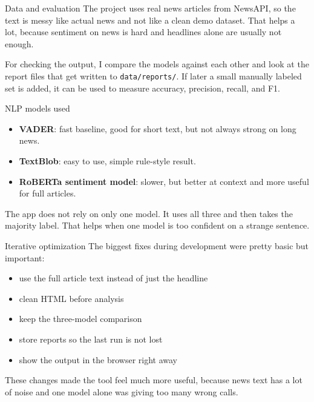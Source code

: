 \documentclass[aspectratio=169]{beamer}
\newcommand{\pkg}[1]{\texttt{#1}}
\begin{document}
\begin{frame}{Data and evaluation}
The project uses real news articles from NewsAPI, so the text is messy like actual news and not like a clean demo dataset. That helps a lot, because sentiment on news is hard and headlines alone are usually not enough.

\vspace{2mm}
For checking the output, I compare the models against each other and look at the report files that get written to \pkg{data/reports/}. If later a small manually labeled set is added, it can be used to measure accuracy, precision, recall, and F1.
\end{frame}

\begin{frame}{NLP models used}
\begin{itemize}
    \item \textbf{VADER}: fast baseline, good for short text, but not always strong on long news.
    \item \textbf{TextBlob}: easy to use, simple rule-style result.
    \item \textbf{RoBERTa sentiment model}: slower, but better at context and more useful for full articles.
\end{itemize}

\vspace{2mm}
The app does not rely on only one model. It uses all three and then takes the majority label. That helps when one model is too confident on a strange sentence.
\end{frame}

\begin{frame}{Iterative optimization}
The biggest fixes during development were pretty basic but important:
\begin{itemize}
    \item use the full article text instead of just the headline
    \item clean HTML before analysis
    \item keep the three-model comparison
    \item store reports so the last run is not lost
    \item show the output in the browser right away
\end{itemize}

\vspace{2mm}
These changes made the tool feel much more useful, because news text has a lot of noise and one model alone was giving too many wrong calls.
\end{frame}
\end{document}
